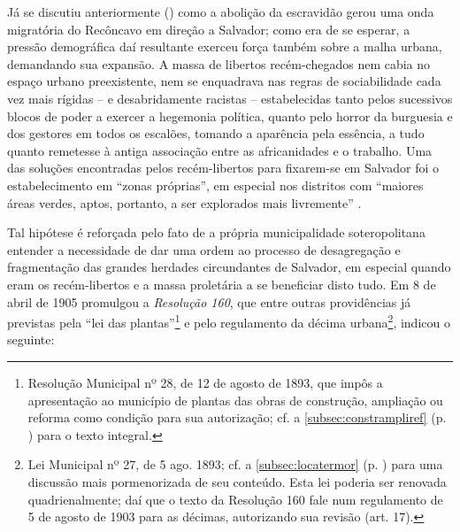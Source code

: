Já se discutiu anteriormente () como a abolição da escravidão gerou uma onda migratória do Recôncavo em direção a Salvador; como era de se esperar, a pressão demográfica daí resultante exerceu força também sobre a malha urbana, demandando sua expansão. A massa de libertos recém-chegados nem cabia no espaço urbano preexistente, nem se enquadrava nas regras de sociabilidade cada vez mais rígidas -- e desabridamente racistas -- estabelecidas tanto pelos sucessivos blocos de poder a exercer a hegemonia política, quanto pelo horror da burguesia e dos gestores em todos os escalões, tomando a aparência pela essência, a tudo quanto remetesse à antiga associação entre as africanidades e o trabalho. Uma das soluções encontradas pelos recém-libertos para fixarem-se em Salvador foi o estabelecimento em ``zonas próprias'', em especial nos distritos com ``maiores áreas verdes, aptos, portanto, a ser explorados mais livremente'' \cite{santos_habitacao_1990}. 

Tal hipótese é reforçada pelo fato de a própria municipalidade soteropolitana entender a necessidade de dar uma ordem ao processo de desagregação e fragmentação das grandes herdades circundantes de Salvador, em especial quando eram os recém-libertos e a massa proletária a se beneficiar disto tudo. Em 8 de abril de 1905 promulgou a \textit{Resolução 160}, que entre outras providências já previstas pela ``lei das plantas''\footnote{Resolução Municipal nº 28, de 12 de agosto de 1893, que impôs a apresentação ao município de plantas das obras de construção, ampliação ou reforma como condição para sua autorização; cf. a \autoref{subsec:constrampliref} (p. \pageref{subsec:constrampliref}) para o texto integral.} e pelo regulamento da décima urbana\footnote{Lei Municipal nº 27, de 5 ago. 1893; cf. a \autoref{subsec:locatermor} (p. \pageref{subsec:locatermor}) para uma discussão mais pormenorizada de seu conteúdo. Esta lei poderia ser renovada quadrienalmente; daí que o texto da Resolução 160 fale num regulamento de 5 de agosto de 1903 para as décimas, autorizando sua revisão (art. 17).}, indicou o seguinte:

